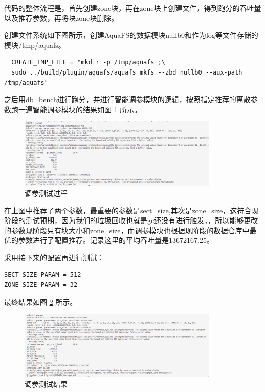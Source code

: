 代码的整体流程是，首先创建zone块，再在zone块上创建文件，得到跑分的吞吐量以及推荐参数，再将块zone块删除。

创建文件系统如下图所示，创建AquaFS的数据模块nullb0和作为log等文件存储的模块/tmp/aquafs。

\begin{lstlisting}
  CREATE_TMP_FILE = "mkdir -p /tmp/aquafs ;\
  sudo ../build/plugin/aquafs/aquafs mkfs --zbd nullb0 --aux-path /tmp/aquafs"
\end{lstlisting}

之后用db\_bench进行跑分，并进行智能调参模块的逻辑，按照指定推荐的离散参数跑一遍智能调参模块的结果如图 \ref{test-turnner2} 所示。

\begin{figure}[htbp]
  \centering
  \includegraphics[width=0.85\textwidth]{fig/turnner2}
  \caption{ 调参测试过程 }
  \label{test-turnner2}
\end{figure}

在上图中推荐了两个参数，最重要的参数是sect\_size,其次是zone\_size，这符合现阶段的测试预期，因为我们的垃圾回收也就是gc还没有进行触发，，所以能够更改的参数现阶段只有块大小和zone\_size，而调参模块也根据现阶段的数据仓库中最优的参数进行了配置推荐。记录这里的平均吞吐量是13672167.25。

采用接下来的配置再进行测试：

\begin{lstlisting}
SECT_SIZE_PARAM = 512
ZONE_SIZE_PARAM = 32
\end{lstlisting}

最终结果如图 \ref{test-turnner3} 所示。

\begin{figure}[htbp]
  \centering
  \includegraphics[width=0.85\textwidth]{fig/turnner3}
  \caption{ 调参测试结果 }
  \label{test-turnner3}
\end{figure}

